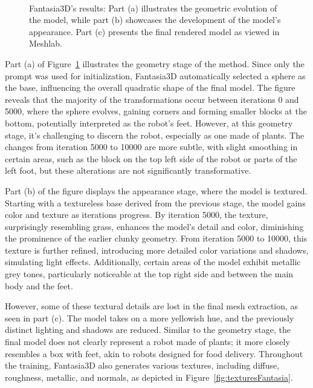 \begin{figure}[H]
\begin{subfigure}[b]{0.37\textwidth}
        \caption{}
    \end{subfigure}
    \caption{Fantasia3D's results: Part (a) illustrates the geometric evolution of the model, while part (b) showcases the development of the model's appearance. Part (c) presents the final rendered model as viewed in Meshlab.}~\label{fig:generationFantasia}
\end{figure}

Part (a) of Figure~\ref{fig:generationFantasia} illustrates the geometry stage of the method. Since only the prompt was used for initialization, Fantasia3D automatically selected a sphere as the base, influencing the overall quadratic shape of the final model. The figure reveals that the majority of the transformations occur between iterations 0 and 5000, where the sphere evolves, gaining corners and forming smaller blocks at the bottom, potentially interpreted as the robot's feet. However, at this geometry stage, it's challenging to discern the robot, especially as one made of plants. The changes from iteration 5000 to 10000 are more subtle, with slight smoothing in certain areas, such as the block on the top left side of the robot or parts of the left foot, but these alterations are not significantly transformative.

Part (b) of the figure displays the appearance stage, where the model is textured. Starting with a textureless base derived from the previous stage, the model gains color and texture as iterations progress. By iteration 5000, the texture, surprisingly resembling grass, enhances the model's detail and color, diminishing the prominence of the earlier clunky geometry. From iteration 5000 to 10000, this texture is further refined, introducing more detailed color variations and shadows, simulating light effects. Additionally, certain areas of the model exhibit metallic grey tones, particularly noticeable at the top right side and between the main body and the feet. 

However, some of these textural details are lost in the final mesh extraction, as seen in part (c). The model takes on a more yellowish hue, and the previously distinct lighting and shadows are reduced. Similar to the geometry stage, the final model does not clearly represent a robot made of plants; it more closely resembles a box with feet, akin to robots designed for food delivery. Throughout the training, Fantasia3D also generates various textures, including diffuse, roughness, metallic, and normals, as depicted in Figure~\ref{fig:texturesFantasia}.

